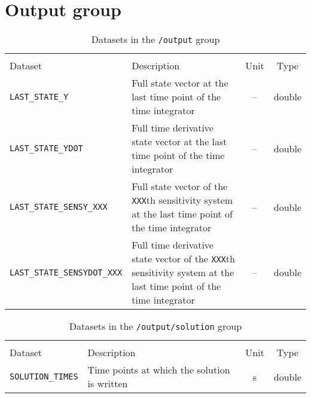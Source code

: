\FloatBarrier
\section{Output group}\label{sec:FFOutput}

\begin{table}[!ht]
\footnotesize
\begin{tabu}to \linewidth[m]{lX[m]cc} \toprule
{} \\
\rowfont[c]\normalfont Dataset & Description & Unit & Type \everyrow{\midrule}\\      
\texttt{LAST\_STATE\_Y}& Full state vector at the last time point of the time integrator & -- & double \\
\texttt{LAST\_STATE\_YDOT}& Full time derivative state vector at the last time point of the time integrator & -- & double \\
\texttt{LAST\_STATE\_SENSY\_XXX}& Full state vector of the \texttt{XXX}th sensitivity system at the last time point of the time integrator & -- & double \\
\texttt{LAST\_STATE\_SENSYDOT\_XXX}& Full time derivative state vector of the \texttt{XXX}th sensitivity system at the last time point of the time integrator & -- & double \everyrow{}\\
\bottomrule
\end{tabu}
\caption{\label{tab:FFOutput}Datasets in the \texttt{/output} group}
\end{table}

\begin{table}[!ht]
\footnotesize
\begin{tabu}to \linewidth[m]{lX[m]cc} \toprule
{} \\
\rowfont[c]\normalfont Dataset & Description & Unit & Type \everyrow{\midrule}\\      
\texttt{SOLUTION\_TIMES} & Time points at which the solution is written & \si{\second} & double \everyrow{}\\
\bottomrule
\end{tabu}
\caption{\label{tab:FFOutputSolution}Datasets in the \texttt{/output/solution} group}
\end{table}


